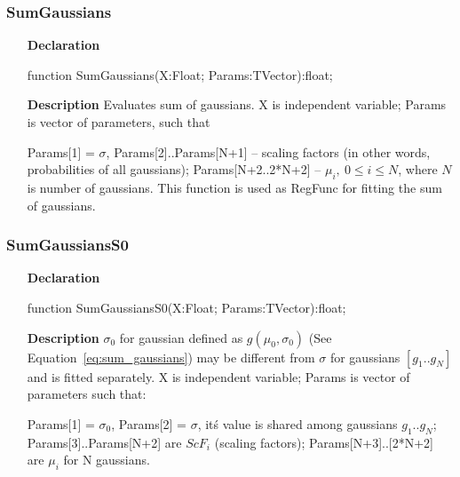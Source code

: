 \documentclass[12pt,a4paper,oneside]{report}
\newcommand{\declarationitem}[1]{\textbf{#1}}
\newcommand{\descriptiontitle}[1]{\textbf{#1}}
\begin{document}
\subsubsection{SumGaussians}
\label{ugauss-SumGaussians}
\begin{itemize}\item[\declarationitem{Declaration}\hfill]
	\begin{flushleft}
		\begin{ttfamily}
			function SumGaussians(X:Float; Params:TVector):float;\end{ttfamily}
		
	\end{flushleft}
	
	\par
	\item[\descriptiontitle{Description}]
	Evaluates sum of gaussians. X is independent variable; Params is vector of parameters, such that 
	
	Params[1] = $\sigma$, Params[2]..Params[N+1] -- scaling factors (in other words, probabilities of all gaussians); Params[N+2..2*N+2] -- $\mu_i,\ 0 \le i \le N$, where $N$ is number of gaussians. This function is used as RegFunc for fitting the sum of gaussians.
	
\end{itemize}
\subsubsection{SumGaussiansS0}
\label{ugauss-SumGaussiansS0}
\begin{itemize}\item[\declarationitem{Declaration}\hfill]
	\begin{flushleft}
		\begin{ttfamily}
			function SumGaussiansS0(X:Float; Params:TVector):float;\end{ttfamily}
		
	\end{flushleft}
	
	\par
	\item[\descriptiontitle{Description}]
	$\sigma_0$ for gaussian defined as $g(\mu_0,\sigma_0)$ (See Equation~\ref{eq:sum_gaussians}) may be different from $\sigma$ for gaussians $[g_1..g_N]$ and is fitted separately. X is independent variable; Params is vector of parameters such that:
	
	Params[1] = $\sigma_0$, Params[2] = $\sigma$, it\'s value is shared among gaussians $g_1..g_N$; Params[3]..Params[N+2] are $ScF_i$ (scaling factors); Params[N+3]..[2*N+2] are $\mu_i$ for N gaussians.
	
\end{itemize}
\end{document}
